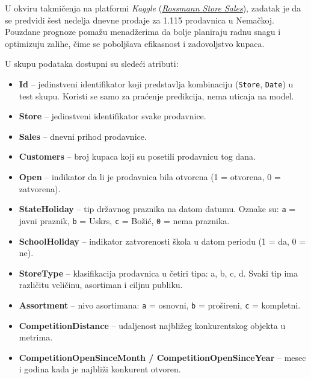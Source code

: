 \documentclass[12pt]{article}
\begin{document}
U okviru takmičenja na platformi \textit{Kaggle} (\href{https://www.kaggle.com/competitions/rossmann-store-sales}{\textit{Rossmann Store Sales}}), zadatak je da se predvidi šest nedelja dnevne prodaje za 1.115 prodavnica u Nemačkoj. Pouzdane prognoze pomažu menadžerima da bolje planiraju radnu snagu i optimizuju zalihe, čime se poboljšava efikasnost i zadovoljstvo kupaca.

U skupu podataka dostupni su sledeći atributi:

\begin{itemize}
    \item \textbf{Id} – jedinstveni identifikator koji predstavlja kombinaciju (\texttt{Store}, \texttt{Date}) u test skupu. Koristi se samo za praćenje predikcija, nema uticaja na model.
    
    \item \textbf{Store} – jedinstveni identifikator svake prodavnice.
    
    \item \textbf{Sales} – dnevni prihod prodavnice. 
    
    \item \textbf{Customers} – broj kupaca koji su posetili prodavnicu tog dana.
    \item \textbf{Open} – indikator da li je prodavnica bila otvorena (1 = otvorena, 0 = zatvorena).
    
    \item \textbf{StateHoliday} – tip državnog praznika na datom datumu. Oznake su: \texttt{a} = javni praznik, \texttt{b} = Uskrs, \texttt{c} = Božić, \texttt{0} = nema praznika. 
    
    \item \textbf{SchoolHoliday} – indikator zatvorenosti škola u datom periodu (1 = da, 0 = ne). 
    
    \item \textbf{StoreType} – klasifikacija prodavnica u četiri tipa: a, b, c, d. Svaki tip ima različitu veličinu, asortiman i ciljnu publiku.
    
    \item \textbf{Assortment} – nivo asortimana: \texttt{a} = osnovni, \texttt{b} = prošireni, \texttt{c} = kompletni.
    
    \item \textbf{CompetitionDistance} – udaljenost najbližeg konkurentskog objekta u metrima. 
    \item \textbf{CompetitionOpenSinceMonth / CompetitionOpenSinceYear} – mesec i godina kada je najbliži konkurent otvoren. 
    

\end{itemize}
\end{document}
